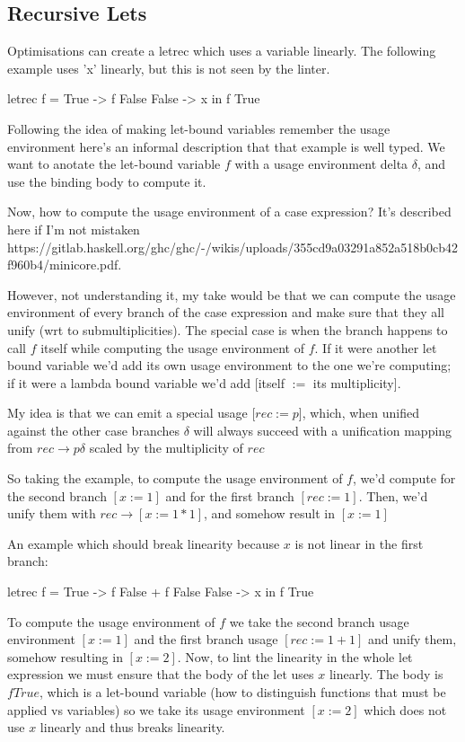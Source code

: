 \documentclass[a4paper, draft]{article}
\begin{document}
\subsection{Recursive Lets}

Optimisations can create a letrec which uses a variable linearly. The following
example uses 'x' linearly, but this is not seen by the linter.
\begin{code}
letrec f = \case
        True -> f False
        False -> x
in f True
\end{code}

Following the idea of making let-bound variables remember the usage environment
here's an informal description that that example is well typed. We want to
anotate the let-bound variable $f$ with a usage environment delta $\delta$, and
use the binding body to compute it.

Now, how to compute the usage environment of a case expression? It's described
here if I'm not mistaken
https://gitlab.haskell.org/ghc/ghc/-/wikis/uploads/355cd9a03291a852a518b0cb42f960b4/minicore.pdf.

However, not understanding it, my take would be that we can compute the usage
environment of every branch of the case expression and make sure that they all
unify (wrt to submultiplicities). The special case is when the branch happens to
call $f$ itself while computing the usage environment of $f$. If it were another
let bound variable we'd add its own usage environment to the one we're
computing; if it were a lambda bound variable we'd add [itself $:=$ its
multiplicity].

My idea is that we can emit a special usage [$rec := p$], which, when unified
against the other case branches $\delta$ will always succeed with a unification
mapping from $rec \rightarrow p\delta$ scaled by the multiplicity of $rec$

So taking the example, to compute the usage environment of $f$, we'd compute for
the second branch $[x := 1]$ and for the first branch $[rec := 1]$. Then, we'd
unify them with $rec \rightarrow [x := 1*1]$, and somehow result in $[x := 1]$

An example which should break linearity because $x$ is not linear in the first
branch:
\begin{code}
letrec f = \case
         True -> f False + f False
         False -> x
    in f True
\end{code}

To compute the usage environment of $f$ we take the second branch usage
environment $[x := 1]$ and the first branch usage $[rec := 1+1]$ and unify them,
somehow resulting in $[x := 2]$. Now, to lint the linearity in the whole let
expression we must ensure that the body of the let uses $x$ linearly. The body
is $f True$, which is a let-bound variable (how to distinguish functions that
must be applied vs variables) so we take its usage environment $[x := 2]$ which
does not use $x$ linearly and thus breaks linearity.
\end{document}
